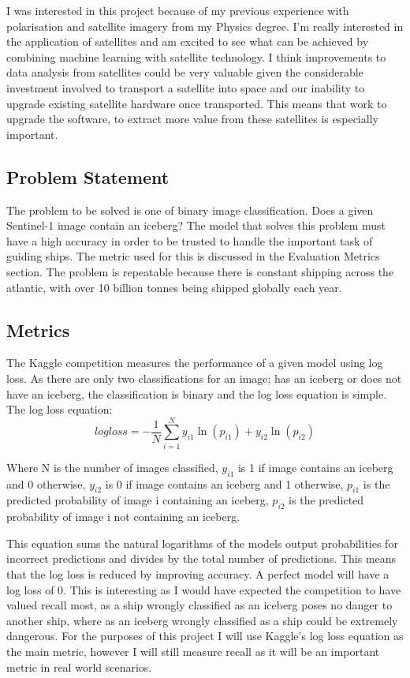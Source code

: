 \documentclass{article}
\begin{document}
I was interested in this project because of my previous experience with polarisation and satellite imagery from my Physics degree. I'm really interested in the application of satellites and am excited to see what can be achieved by combining machine learning with satellite technology. I think improvements to data analysis from satellites could be very valuable given the considerable investment involved to transport a satellite into space and our inability to upgrade existing satellite hardware once transported. This means that work to upgrade the software, to extract more value from these satellites is especially important.

\subsection{Problem Statement}
The problem to be solved is one of binary image classification. Does a given Sentinel-1 image contain an iceberg? The model that solves this problem must have a high accuracy in order to be trusted to handle the important task of guiding ships. The metric used for this is discussed in the Evaluation Metrics section. The problem is repeatable because there is constant shipping across the atlantic, with over 10 billion tonnes being shipped globally each year. \cite{unctad}

\subsection{Metrics}
The Kaggle competition measures the performance of a given model using log loss. As there are only two classifications for an image; has an iceberg or does not have an iceberg, the classification is binary and the log loss equation is simple. The log loss equation: \cite{logloss}
\[ log loss = - \frac{1}{N} \sum_{i=1}^{N} y_{i1}\ln(p_{i1}) + y_{i2}\ln(p_{i2}) \]

Where N is the number of images classified, $y_{i1}$ is 1 if image contains an iceberg and 0 otherwise, $y_{i2}$ is 0 if image contains an iceberg and 1 otherwise, $p_{i1}$ is the predicted probability of image i containing an iceberg, $p_{i2}$ is the predicted probability  of image i not containing an iceberg. 

This equation sums the natural logarithms of the models output probabilities for incorrect predictions and divides by the total number of predictions. This means that the log loss is reduced by improving accuracy. A perfect model will have a log loss of 0. This is interesting as I would have expected the competition to have valued recall most, as a ship wrongly classified as an iceberg poses no danger to another ship, where as an iceberg wrongly classified as a ship could be extremely dangerous. For the purposes of this project I will use Kaggle's log loss equation as the main metric, however I will still measure recall as it will be an important metric in real world scenarios. 
\end{document}
